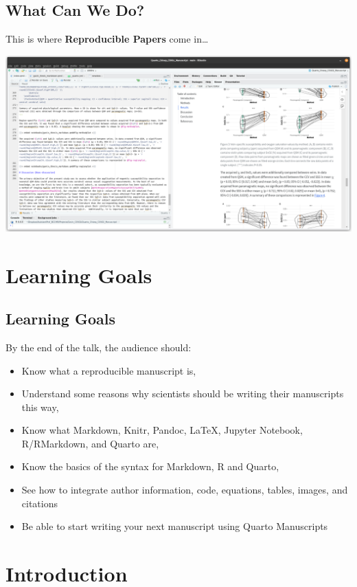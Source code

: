 \documentclass[
  letterpaper,
  DIV=11,
  numbers=noendperiod]{scrartcl}
\providecommand{\tightlist}{%
  \setlength{\itemsep}{0pt}\setlength{\parskip}{0pt}}\usepackage{longtable,booktabs,array}
\begin{document}
\subsection{What Can We Do?}\label{what-can-we-do-3}

This is where \textbf{Reproducible Papers} come in\ldots{}

\includegraphics{img/reprocpaper_example.png}

\section{Learning Goals}\label{learning-goals}

\subsection{Learning Goals}\label{learning-goals-1}

By the end of the talk, the audience should:

\begin{itemize}
\tightlist
\item
  Know what a reproducible manuscript is,
\item
  Understand some reasons why scientists should be writing their
  manuscripts this way,
\item
  Know what Markdown, Knitr, Pandoc, LaTeX, Jupyter Notebook,
  R/RMarkdown, and Quarto are,
\item
  Know the basics of the syntax for Markdown, R and Quarto,
\item
  See how to integrate author information, code, equations, tables,
  images, and citations
\item
  Be able to start writing your next manuscript using Quarto Manuscripts
\end{itemize}

\section{Introduction}\label{introduction}
\end{document}
